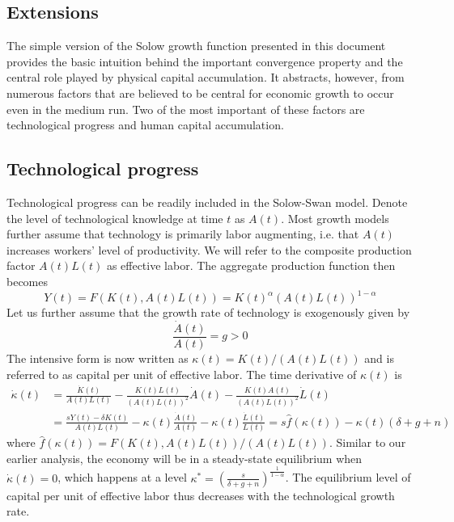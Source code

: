 \documentclass[\topdir/lecture\_notes.tex]{subfiles}
\begin{document}
\subsection{Extensions}
The simple version of the Solow growth function presented in this document provides the basic intuition behind the important convergence property and the central role played by physical capital accumulation.
It abstracts, however, from numerous factors that are believed to be central for economic growth to occur even in the medium run.
Two of the most important of these factors are technological progress and human capital accumulation.

\subsection{Technological progress}
Technological progress can be readily included in the Solow-Swan model.
Denote the level of technological knowledge at time $t$ as $A(t)$.
Most growth models further assume that technology is primarily labor augmenting, i.e. that $A(t)$ increases workers' level of productivity.
We will refer to the composite production factor $A(t) L(t)$ as effective labor.
The aggregate production function then becomes
\begin{equation}
  Y(t)=F(K(t), A(t) L(t))=K(t)^{\alpha}(A(t) L(t))^{1-\alpha}
  \label{eq:solow-production-tech}
\end{equation}
Let us further assume that the growth rate of technology is exogenously given by
\begin{equation}
  \frac{\dot{A}(t)}{A(t)}=g>0
  \label{eq:solow-tech-growth}
\end{equation}
The intensive form is now written as $\kappa(t)=K(t) / (A(t) L(t))$ and is referred to as capital per unit of effective labor.
The time derivative of $\kappa(t)$ is
\begin{equation}
\begin{aligned}
\dot{\kappa}(t) & =\frac{\dot{K}(t)}{A(t) L(t)}-\frac{K(t) L(t)}{(A(t) L(t))^{2}} \dot{A}(t)-\frac{K(t) A(t)}{(A(t) L(t))^{2}} \dot{L}(t) \\
& =\frac{s Y(t)-\delta K(t)}{A(t) L(t)}-\kappa(t) \frac{\dot{A}(t)}{A(t)}-\kappa(t) \frac{\dot{L}(t)}{L(t)}=s \hat{f}(\kappa(t))-\kappa(t)(\delta+g+n)
\end{aligned}
\label{eq:solow-kappa-dot}
\end{equation}
where $\hat{f}(\kappa(t))=F(K(t), A(t) L(t)) / (A(t) L(t))$.
Similar to our earlier analysis, the economy will be in a steady-state equilibrium when $\dot{\kappa}(t)=0$, which happens at a level $\kappa^{*}=\left(\frac{s}{\delta+g+n}\right)^{\frac{1}{1-\alpha}}$.
The equilibrium level of capital per unit of effective labor thus decreases with the technological growth rate.
\end{document}
